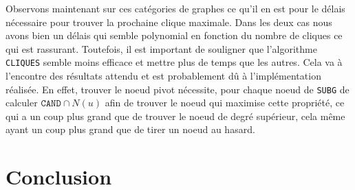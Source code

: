 \documentclass[12pt,a4paper]{article}
\begin{document}
Observons maintenant sur ces catégories de graphes ce qu'il en est pour le délais nécessaire pour trouver la prochaine clique maximale. Dans les deux cas nous avons bien un délais qui semble polynomial en fonction du nombre de cliques ce qui est rassurant. Toutefois, il est important de souligner que l'algorithme \texttt{CLIQUES} semble moins efficace et mettre plus de temps que les autres. Cela va à l'encontre des résultats attendu et est probablement dû à l'implémentation réalisée. En effet, trouver le noeud pivot nécessite, pour chaque noeud de \texttt{SUBG} de calculer \(\texttt{CAND} \cap N(u)\) afin de trouver le noeud qui maximise cette propriété, ce qui a un coup plus grand que de trouver le noeud de degré supérieur, cela même ayant un coup plus grand que de tirer un noeud au hasard.


\section{Conclusion}




\end{document}
